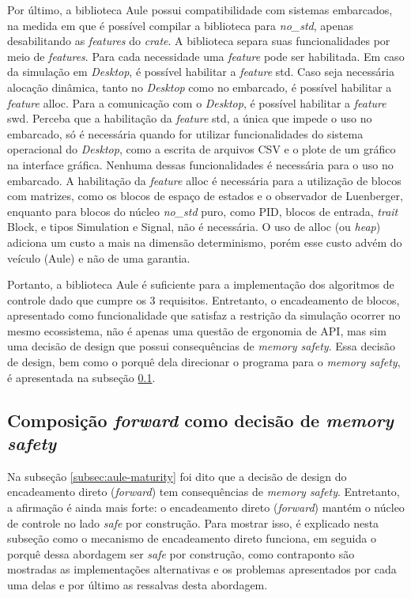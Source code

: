 Por último, a biblioteca Aule possui compatibilidade com sistemas embarcados, na medida em que é possível compilar a biblioteca para \textit{no\_std}, apenas desabilitando as \textit{features} do \textit{crate}. A biblioteca separa suas funcionalidades por meio de \textit{features}. Para cada necessidade uma \textit{feature} pode ser habilitada. Em caso da simulação em \textit{Desktop}, é possível habilitar a \textit{feature} std. Caso seja necessária alocação dinâmica, tanto no \textit{Desktop} como no embarcado, é possível habilitar a \textit{feature} alloc. Para a comunicação com o \textit{Desktop}, é possível habilitar a \textit{feature} swd. Perceba que a habilitação da \textit{feature} std, a única que impede o uso no embarcado, só é necessária quando for utilizar funcionalidades do sistema operacional do \textit{Desktop}, como a escrita de arquivos \ac{CSV} e o plote de um gráfico na interface gráfica. Nenhuma dessas funcionalidades é necessária para o uso no embarcado. A habilitação da \textit{feature} alloc é necessária para a utilização de blocos com matrizes, como os blocos de espaço de estados e o observador de Luenberger, enquanto para blocos do núcleo \textit{no\_std} puro, como \ac{PID}, blocos de entrada, \textit{trait} Block, e tipos Simulation e Signal, não é necessária. O uso de alloc (ou \textit{heap}) adiciona um custo a mais na dimensão determinismo, porém esse custo advém do veículo (Aule) e não de uma garantia.

Portanto, a biblioteca Aule é suficiente para a implementação dos algoritmos de controle dado que cumpre os 3 requisitos. Entretanto, o encadeamento de blocos, apresentado como funcionalidade que satisfaz a restrição da simulação ocorrer no mesmo ecossistema, não é apenas uma questão de ergonomia de \ac{API}, mas sim uma decisão de design que possui consequências de \textit{memory safety}. Essa decisão de design, bem como o porquê dela direcionar o programa para o \textit{memory safety}, é apresentada na subseção \ref{subsec:design-choice}.

\subsection{Composição \textit{forward} como decisão de \textit{memory safety}}
\label{subsec:design-choice}

Na subseção \ref{subsec:aule-maturity} foi dito que a decisão de design do encadeamento direto (\textit{forward}) tem consequências de \textit{memory safety}. Entretanto, a afirmação é ainda mais forte: o encadeamento direto (\textit{forward}) mantém o núcleo de controle no lado \textit{safe} por construção. Para mostrar isso, é explicado nesta subseção como o mecanismo de encadeamento direto funciona, em seguida o porquê dessa abordagem ser \textit{safe} por construção, como contraponto são mostradas as implementações alternativas e os problemas apresentados por cada uma delas e por último as ressalvas desta abordagem.

